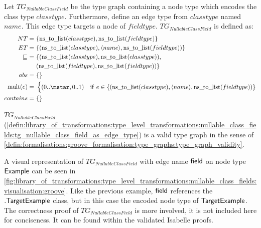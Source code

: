 \begin{defin}
\label{defin:library_of_transformations:type_level_transformations:nullable_class_fields:tg_nullable_class_field_as_edge_type}
Let $TG_{NullableClassField}$ be the type graph containing a node type which encodes the class type $classtype$. Furthermore, define an edge type from $classtype$ named $name$. This edge type targets a node of $fieldtype$. $TG_{NullableClassField}$ is defined as:
\begin{align*}
NT =\ &\{\mathrm{ns\_\!to\_\!list}(classtype), \mathrm{ns\_\!to\_\!list}(fieldtype)\} \\
ET =\ &\{(\mathrm{ns\_\!to\_\!list}(classtype), \langle name \rangle, \mathrm{ns\_\!to\_\!list}(fieldtype))\} \\
\!\!\sqsubseteq\ =\ &\{( \mathrm{ns\_\!to\_\!list}(classtype), \mathrm{ns\_\!to\_\!list}(classtype) ),\\&( \mathrm{ns\_\!to\_\!list}(fieldtype), \mathrm{ns\_\!to\_\!list}(fieldtype) )\} \\
abs =\ &\{\} \\
\mathrm{mult}(e) =\ &\begin{cases}
    (0..\mstar, 0..1) &\mathrm{if}\ e \in \{(\mathrm{ns\_\!to\_\!list}(classtype), \langle name \rangle, \mathrm{ns\_\!to\_\!list}(fieldtype))\}
\end{cases} \\
contains =\ &\{\}
\end{align*}
\end{defin}

\begin{thm}
\label{defin:library_of_transformations:type_level_transformations:nullable_class_fields:tg_nullable_class_field_as_edge_type_correct}
$TG_{NullableClassField}$ (\cref{defin:library_of_transformations:type_level_transformations:nullable_class_fields:tg_nullable_class_field_as_edge_type}) is a valid type graph in the sense of \cref{defin:formalisations:groove_formalisation:type_graphs:type_graph_validity}.
\end{thm}

A visual representation of $TG_{NullableClassField}$ with edge name $\mathsf{field}$ on node type $\mathsf{Example}$ can be seen in \cref{fig:library_of_transformations:type_level_transformations:nullable_class_fields:visualisation:groove}. Like the previous example, $\mathsf{field}$ references the $.\mathsf{TargetExample}$ class, but in this case the encoded node type of $\mathsf{TargetExample}$. The correctness proof of $TG_{NullableClassField}$ is more involved, it is not included here for conciseness. It can be found within the validated Isabelle proofs.

